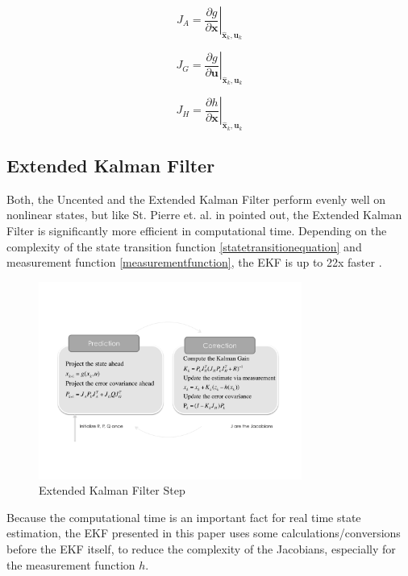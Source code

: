 \documentclass[conference]{IEEEtran}
\begin{document}
\begin{equation}J_{A} = \left . \frac{\partial g}{\partial \boldsymbol{x} } \right \vert _{\hat{\boldsymbol{x}}_{k},\boldsymbol{u}_{k}}\end{equation}

\begin{equation}J_{G} = \left . \frac{\partial g}{\partial \boldsymbol{u} } \right \vert _{\hat{\boldsymbol{x}}_{k},\boldsymbol{u}_{k}}\end{equation}

\begin{equation}J_{H} = \left . \frac{\partial h}{\partial \boldsymbol{x} } \right \vert _{\hat{\boldsymbol{x}}_{k},\boldsymbol{u}_{k}}\end{equation}

\subsection{Extended Kalman Filter}

Both, the Uncented and the Extended Kalman Filter perform evenly well on nonlinear states, but like St. Pierre et. al. in \cite{St-Pierre2004} pointed out, the Extended Kalman Filter is significantly more efficient in computational time. Depending on the complexity of the state transition function \eqref{statetransitionequation} and measurement function \eqref{measurementfunction}, the EKF is up to 22x faster \cite{St-Pierre2004}.

\begin{figure}[ht]
\centering
\includegraphics[width=3.4in]{images/Extended-Kalman-Filter-Step.pdf}
\caption{Extended Kalman Filter Step}
\label{EKF}
\end{figure}

Because the computational time is an important fact for real time state estimation, the EKF presented in this paper uses some calculations/conversions before the EKF itself, to reduce the complexity of the Jacobians, especially for the measurement function $h$.
\end{document}
